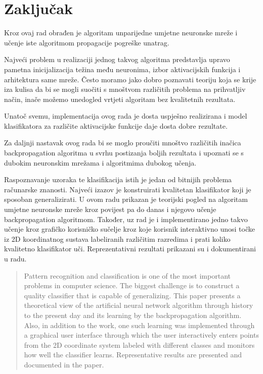 \documentclass[times, utf8, zavrsni]{fer}
\begin{document}
\chapter{Zaključak}
Kroz ovaj rad obrađen je algoritam unparijedne umjetne neuronske mreže i učenje iste algoritmom propagacije pogreške unatrag.

Najveći problem u realizaciji jednog takvog algoritma predstavlja upravo pametna inicijalizacija težina među neuronima, izbor aktivacijskih funkcija i arhitektura same mreže. Često moramo jako dobro poznavati teoriju koja se krije iza kulisa da bi se mogli suočiti s mnoštvom različitih problema na prihvatljiv način, inače možemo unedogled vrtjeti algoritam bez kvalitetnih rezultata.

Unatoč svemu, implementacija ovog rada je dosta uspješno realizirana i model klasifikatora za različite aktivacijske funkcije daje dosta dobre rezultate.

\bigskip
Za daljnji nastavak ovog rada bi se moglo proučiti mnoštvo različitih inačica backpropagation algoritma u svrhu postizanja boljih rezultata i upoznati se s dubokim neuronskim mrežama i algoritmima dubokog učenja.




\begin{sazetak}
Raspoznavanje uzoraka te klasifikacija istih je jedan od bitnijih problema računarske znanosti. Najveći izazov je konstruirati kvalitetan klasifikator koji je sposoban generalizirati. U ovom radu prikazan je teorijski pogled na algoritam umjetne neuronske mreže kroz povijest pa do danas i njegovo učenje backpropagation algoritmom. Također, uz rad je i implementirano jedno takvo učenje kroz grafičko korisničko sučelje kroz koje korisnik interaktivno unosi točke iz 2D koordinatnog sustava labeliranih različitim razredima i prati koliko kvalitetno klasifikator uči. Reprezentativni rezultati prikazani su i dokumentirani u radu.

\end{sazetak}

\begin{abstract}
Pattern recognition and classification is one of the most important problems in computer science. The biggest challenge is to construct a quality classifier that is capable of generalizing. This paper presents a theoretical view of the artificial neural network algorithm through history to the present day and its learning by the backpropagation algorithm. Also, in addition to the work, one such learning was implemented through a graphical user interface through which the user interactively enters points from the 2D coordinate system labeled with different classes and monitors how well the classifier learns. Representative results are presented and documented in the paper.

\end{abstract}
\end{document}
